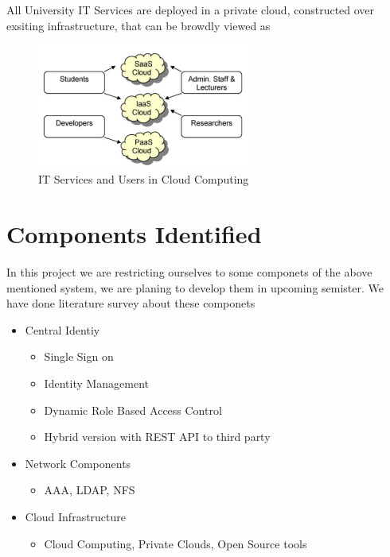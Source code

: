 \documentclass[12pt]{report}
\begin{document}
	All University IT Services are deployed in a private cloud, constructed over exsiting infrastructure, that can be browdly viewed as 
	
\begin{figure}[H]
\begin{center}
\includegraphics[width=7cm]{./it2.png}
\caption{ IT Services and Users in Cloud Computing\label{fig:IT Services and Users in Cloud Computing }}
\end{center}
\end{figure}	
	
	
\section{Components Identified}

In this project we are restricting ourselves to some componets of the above mentioned system, we are planing to develop them in upcoming semister. We have done literature survey about these componets

\begin{itemize}
	\item Central Identiy 
	\begin{itemize}
		\item Single Sign on
		\item Identity Management
		\item Dynamic Role Based Access Control
		\item Hybrid version with REST API to third party 
	\end{itemize}
	\item Network Components
	\begin{itemize}
		\item AAA, LDAP, NFS
	\end{itemize}
	\item Cloud Infrastructure
	\begin{itemize}
		\item Cloud Computing, Private Clouds, Open Source tools 
	\end{itemize}
\end{itemize}
\end{document}
